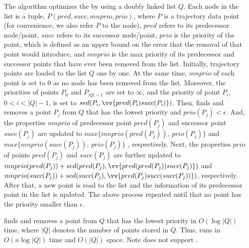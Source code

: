 The \squishe algorithm optimizes the \pavlidis by using a doubly linked list $Q$. Each node in the list is a tuple, \ie $P(pred, succ, mnprio, prio)$, where $P$ is a trajectory data point (for convenience, we also refer $P$ to the node), $pred$ refers to its predecessor node/point, $succ$ refers to its successor node/point, $prio$ is the priority of the point, which is defined as an upper bound on the \sed error that the removal of that point would introduce, and $mnprio$ is the max priority of its predecessor and successor points that have ever been removed from the list.
%
Initially, trajectory points are loaded to the list $Q$ one by one.
At the same time, $mnprio$ of each point is set to $0$ as no node has been removed from the list.
Moreover, the priorities of points $P_0$ and $P_{|Q|-1}$ are set to $\infty$, and the priority of point $P_i$, $0<i<|Q|-1$, is set to $sed(P_i, \vv{pred(P_{i})succ(P_{i})})$.
%
Then, \squishe finds and removes a point $P_j$ from $Q$ that has the lowest priority and $prio(P_j)<\epsilon$.
And, the properties $mnprio$ of predecessor point $pred(P_j)$ and successor point $succ(P_j)$ are updated to $max\{mnprio(pred(P_j)), ~prio(P_j)\}$ and $max\{mnprio(succ(P_j)), ~prio(P_j)\}$ , respectively.
Next, the properties $prio$ of points $pred(P_j)$ and $succ(P_j)$ are further updated to $mnprio(pred(P_j)) + sed(pred(P_j), \vv{pred(pred(P_{j}))succ(P_{j})})$ and $mnprio(succ(P_j)) + sed(succ(P_j),\vv{pred(P_{j})succ(succ(P_{j}))})$, respectively.
%
After that, a new point is read to the list and the information of its predecessor point in the list is updated.
%
The above process repeated until that no point has the priority smaller than $\epsilon$. %

\squishe finds and removes a point from $Q$ that has the lowest priority in $O(\log |Q|)$ time, where $|Q|$ denotes the number of points stored in $Q$.
Thus, \squishe runs in $O(n\log |Q|)$ time and $O(|Q|)$ space. Note \squishe does not support \ped.

